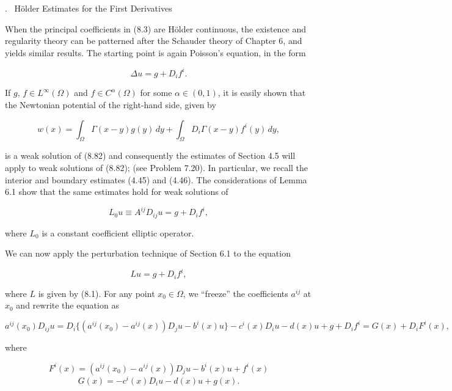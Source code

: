 \medskip

. \ Hölder Estimates for the First Derivatives

\medskip

When the principal coefficients in (8.3) are Hölder continuous, the existence and regularity theory can be patterned after the Schauder theory of Chapter 6, and yields similar results. The starting point is again Poisson's equation, in the form

\begin{equation}
\tag{8.82}
\Delta u = g + D_i f^i.
\end{equation}

If $g$, $f \in L^\infty(\Omega)$ and $f \in C^\alpha(\Omega)$ for some $\alpha \in (0,1)$, it is easily shown that the Newtonian potential of the right-hand side, given by

\[
w(x) = \int_\Omega \Gamma(x-y)g(y)\,dy + \int_\Omega D_i\Gamma(x-y)f^i(y)\,dy,
\]

is a weak solution of (8.82) and consequently the estimates of Section 4.5 will apply to weak solutions of (8.82); (see Problem 7.20). In particular, we recall the interior and boundary estimates (4.45) and (4.46). The considerations of Lemma 6.1 show that the same estimates hold for weak solutions of

\[
L_0u \equiv A^{ij}D_{ij}u = g + D_i f^i,
\]

where $L_0$ is a constant coefficient elliptic operator.





We can now apply the perturbation technique of Section 6.1 to the equation

\begin{equation}
Lu = g + D_i f^i,
\tag{8.83}
\end{equation}

where $L$ is given by (8.1). For any point $x_0 \in \Omega$, we ``freeze'' the coefficients $a^{ij}$ at $x_0$ and rewrite the equation as

\begin{equation}
a^{ij}(x_0)D_{ij}u = D_i\{(a^{ij}(x_0) - a^{ij}(x))D_j u - b^i(x)u\}
 - c^i(x)D_i u - d(x)u + g + D_i f^i
= G(x) + D_i F^i(x),
\tag{8.84}
\end{equation}

where

\[
F^i(x) = (a^{ij}(x_0) - a^{ij}(x))D_j u - b^i(x)u + f^i(x)
\]
\[
G(x) = -c^i(x)D_i u - d(x)u + g(x).
\]

